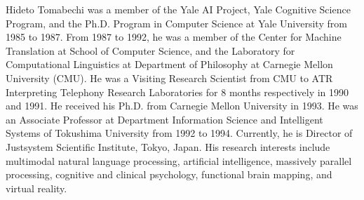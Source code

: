 \begin{biography}
{Hideto Tomabechi was a member of the Yale AI Project, Yale Cognitive
Science Program, and the Ph.D. Program in Computer Science at Yale
University from 1985 to 1987. From 1987 to 1992, he was a member of
the Center for Machine Translation at School of Computer Science, and
the Laboratory for Computational Linguistics at Department of
Philosophy at Carnegie Mellon University (CMU).  He was a Visiting
Research Scientist from CMU to ATR Interpreting Telephony Research
Laboratories for 8 months respectively in 1990 and 1991. He received
his Ph.D. from Carnegie Mellon University in 1993.  He was an
Associate Professor at Department Information Science and Intelligent
Systems of Tokushima University from 1992 to 1994. Currently, he is
Director of Justsystem Scientific Institute, Tokyo, Japan.  His
research interests include multimodal natural language processing,
artificial intelligence, massively parallel processing, cognitive and
clinical psychology, functional brain mapping, and virtual reality.}



\end{biography}










